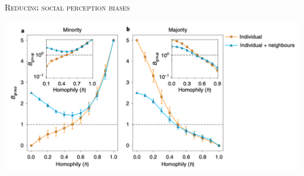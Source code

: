 \documentclass{beamer}
\begin{document}
\begin{frame}
    \centering
    \Large{\textsc{Reducing social perception biases}} \\ \vspace{1cm}
    
\end{frame}

\begin{frame}
    \begin{center}
        \includegraphics[width=\textwidth]{static/reduce_biase_results.png}
    \end{center}
\end{frame}
\end{document}
